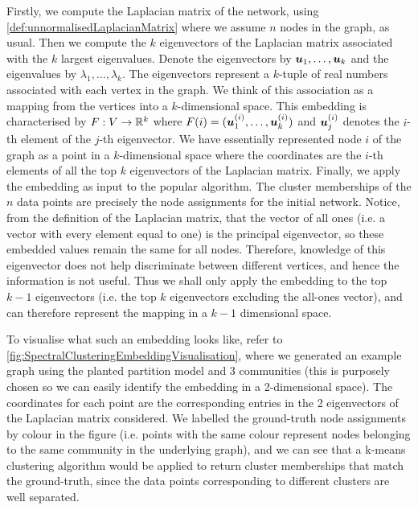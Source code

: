 Firstly, we compute the Laplacian matrix of the network, using \cref{def:unnormalisedLaplacianMatrix} where we assume $n$ nodes in the graph, as usual.
Then we compute the $k$ eigenvectors of the Laplacian matrix associated with the $k$ largest eigenvalues.
Denote the eigenvectors by $\vecvar{u}_{1},\dots,\vecvar{u}_{k}$ and the eigenvalues by $\lambda_{1},\dots,\lambda_{k}$.
The eigenvectors represent a $k$-tuple of real numbers associated with each vertex in the graph. 
We think of this association as a mapping from the vertices into a $k$-dimensional space.
This embedding is characterised by $F : V \rightarrow \mathbb{R}^{k}$ where $F(i) = (\vecvar{u}_{1}^{(i)},\dots,\vecvar{u}_{k}^{(i)})$ and $\vecvar{u}_{j}^{(i)}$ denotes the $i$-th element of the $j$-th eigenvector.
We have essentially represented node $i$ of the graph as a point in a $k$-dimensional space where the coordinates are the $i$-th elements of all the top $k$ eigenvectors of the Laplacian matrix.
Finally, we apply the embedding as input to the popular  algorithm.
The cluster memberships of the $n$ data points are precisely the node assignments for the initial network.
Notice, from the definition of the Laplacian matrix, that the vector of all ones (i.e. a vector with every element equal to one) is the principal eigenvector, so these embedded values remain the same for all nodes.
Therefore, knowledge of this eigenvector does not help discriminate between different vertices, and hence the information is not useful.
Thus we shall only apply the embedding to the top $k-1$ eigenvectors (i.e. the top $k$ eigenvectors excluding the all-ones vector), and can therefore represent the mapping in a $k-1$ dimensional space.

To visualise what such an embedding looks like, refer to \cref{fig:SpectralClusteringEmbeddingVisualisation}, where we generated an example graph using the planted partition model and 3 communities (this is purposely chosen so we can easily identify the embedding in a 2-dimensional space).
The coordinates for each point are the corresponding entries in the 2 eigenvectors of the Laplacian matrix considered.
We labelled the ground-truth node assignments by colour in the figure (i.e. points with the same colour represent nodes belonging to the same community in the underlying graph), and we can see that a k-means clustering algorithm would be applied to return cluster memberships that match the ground-truth, since the data points corresponding to different clusters are well separated.

